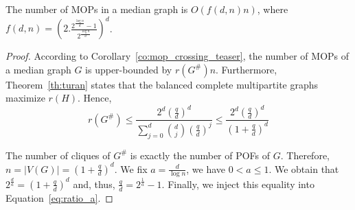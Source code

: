 \documentclass[a4paper,UKenglish,numberwithinsect,cleveref, autoref,anonymous]{lipics-v2021}
\newcommand{\card}[1]{\left| #1 \right|}
\begin{document}
\begin{corollary}
The number of MOPs in a median graph is $O(f(d,n)n)$, where $f(d,n) = \left(2.\frac{2^{\frac{\log n}{d}}-1}{2^{\frac{\log n}{d}}}\right)^d$.
\label{co:number_mops}
\end{corollary}
\begin{proof}
According to Corollary~\ref{co:mop_crossing_teaser}, the number of MOPs of a median graph $G$ is upper-bounded by $r(G^{\#})n$. Furthermore, Theorem~\ref{th:turan} states that the balanced complete multipartite graphs maximize $r(H)$. Hence,
\begin{equation}
    r(G^{\#})\le \frac{2^d(\frac{q}{d})^d}{\sum_{j=0}^d \binom{d}{j}(\frac{q}{d})^j} \le \frac{2^d(\frac{q}{d})^d}{(1+\frac{q}{d})^d}
    \label{eq:ratio_a}
\end{equation}

The number of cliques of $G^{\#}$ is exactly the number of POFs of $G$. Therefore, $n = \card{V(G)} = (1+\frac{q}{d})^d$. We fix $a = \frac{d}{\log n}$, we have $0 < a \le 1$. We obtain that $2^{\frac{d}{a}} = (1+\frac{q}{d})^d$ and, thus, $\frac{q}{d} = 2^{\frac{1}{a}} - 1$. Finally, we inject this equality into Equation~\eqref{eq:ratio_a}.
\end{proof}
\end{document}
